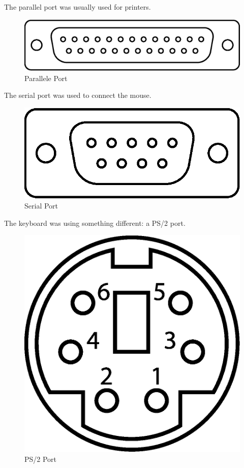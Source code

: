 \documentclass[book.tex]{subfiles}
\begin{document}
The parallel port was usually used for printers.
 \begin{figure}[H]
\centering
\includegraphics[scale=0.7]{imgs/ports/DB-25_parallel_port.eps}
%
\caption{Parallele Port}
\label{fig:parallelPort}
\end{figure}


The serial port was used to connect the mouse.
 \begin{figure}[H]
\centering
\includegraphics[scale=0.7]{imgs/ports/DE9_serial_port.eps}
%
\caption{Serial Port}
\label{fig:serialPort}
\end{figure}

The keyboard was using something different: a PS/2 port.
 \begin{figure}[H]
\centering
\includegraphics[scale=0.2]{imgs/ports/MiniDIN-6_PS2.eps}
%
\caption{PS/2 Port}
\label{fig:ps2Port}
\end{figure}
\end{document}
